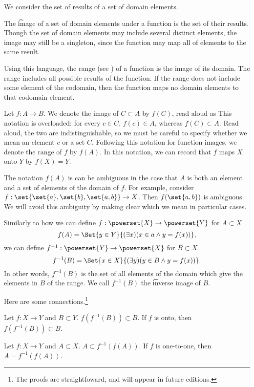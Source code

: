 

We consider the set of results of a set of domain elements.


The \t{image} of a set of domain elements under a function is the set of their results.
Though the set of domain elements may include several distinct elements, the image may still be a singleton, since the function may map all of elements to the same result.

Using this language, the range (see ) of a function is the image of its domain.
The range includes all possible results of the function.
If the range does not include some element of the codomain, then the function maps no domain elements to that codomain element.


Let $f: A \to B$.
We denote the image of $C \subset A$ by $f(C)$, read aloud as 
This notation is overloaded: for every $c \in C$, $f(c) \in A$, whereas $f(C) \subset A$.
Read aloud, the two are indistinguishable, so we must be careful to specify whether we mean an element $c$ or a set $C$.
Following this notation for function images, we denote the range of $f$ by $f(A)$.
In this notation, we can record that $f$ maps $X$ onto $Y$ by $f(X) = Y$.


The notation $f(A)$ is can be ambiguous in the case that $A$ is both an element and a set of elements of the domain of $f$.
For example, consider $f: \set{\set{a}, \set{b}, \set{a, b}} \to X$.
Then $f(\set{a, b})$ is ambiguous.
We will avoid this ambiguity by making clear which we mean in particular cases.



Similarly to how we can define $f: \powerset{X} \to \powerset{Y}$ for $A \subset X$
\[
  f(A) = \Set{y \in Y}{(\exists x)(x \in a \land y = f(x))},
\]
we can define $f^{-1}: \powerset{Y} \to \powerset{X}$ for $B \subset X$
\[
  f^{-1}(B) = \Set{x \in X}{(\exists y)(y \in B \land y = f(x))}.
\]
In other words, $f^{-1}(B)$ is the set of all elements of the domain which give the elements in $B$ of the range.
We call $f^{-1}(B)$ the \t{inverse image} of $B$.

Here are some connections.\footnote{The proofs are straightfoward, and will appear in future editions.}

\begin{proposition}
  Let $f: X \to Y$ and $B \subset Y$.
  $f(f^{-1}(B)) \subset B$. If $f$ is onto, then $f(f^{-1}(B)) \subset B$.
\end{proposition}
\begin{proposition}
  Let $f: X \to Y$ and $A \subset X$.
  $A \subset f^{-1}(f(A))$.
  If $f$ is one-to-one, then $A = f^{-1}(f(A))$.
\end{proposition}

